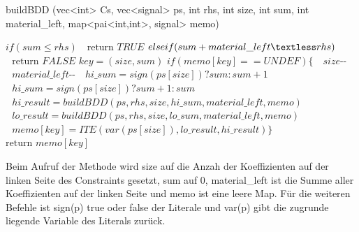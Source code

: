 \documentclass[a4,abstract=on]{scrartcl}
\begin{document}
\begin{algorithm}
\caption{buildBDD (vec<int> Cs, vec<signal> ps, int rhs, int size, int sum, int material\_left, map<pai<int,int>, signal> memo)}
\label{alg:buildBDD}
\begin{algorithmic}

\State $\text{}if (sum \leq rhs)$
\State $\text{~~return } TRUE$
\State $\text{}else if (sum + material\_left \textless rhs)$
\State $\text{~~return } FALSE$
\State $\text{} key = (size, sum)$
\State $\text{}if (memo[key] == UNDEF) \{$
\State $\text{~~} size\text{-{}-}$
\State $\text{~~} material\_left \text{-{}-}$
\State $\text{~~} hi\_sum = sign(ps[size]) ? sum : sum + 1$
\State $\text{~~} hi\_sum = sign(ps[size]) ? sum + 1 : sum$
\State $\text{~~} hi\_result = buildBDD(ps , rhs, size, hi\_sum, material\_left, memo)$
\State $\text{~~} lo\_result = buildBDD(ps , rhs, size, lo\_sum, material\_left, memo)$
\State $\text{~~} memo[key] = ITE(var(ps[size]), lo\_result, hi\_result)\}$
\State $\text{return }memo[key]$
\end{algorithmic}
\end{algorithm}

Beim Aufruf der Methode wird size auf die Anzah der Koeffizienten auf der linken Seite des Constraints gesetzt, sum auf $0$, material\_left ist die Summe aller Koeffizienten auf der linken Seite und memo ist eine leere Map. Für die weiteren Befehle ist sign(p) true oder false der Literale und var(p) gibt die zugrunde liegende Variable des Literals zurück.\\
\end{document}
